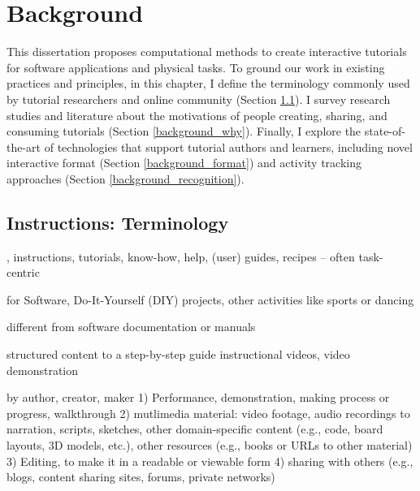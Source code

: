 
\chapter{Background}

This dissertation proposes computational methods to create interactive tutorials for software applications and physical tasks. To ground our work in existing practices and principles, in this chapter, I define the terminology commonly used by tutorial researchers and online community (Section \ref{background_terms}).
%
I survey research studies and literature about the motivations of people creating, sharing, and consuming tutorials (Section \ref{background_why}).
%
Finally, I explore the state-of-the-art of technologies that support tutorial authors and learners, including novel interactive format (Section \ref{background_format}) and activity tracking approaches (Section \ref{background_recognition}).


\section{Instructions: Terminology}
\label{background_terms}

, instructions, tutorials, know-how, help, (user) guides, recipes -- often task-centric

for Software, Do-It-Yourself (DIY) projects, other activities like sports or dancing

different from software documentation or manuals

structured content to a step-by-step guide
instructional videos, video demonstration

by author, creator, maker
1) Performance, demonstration, making process or progress, walkthrough
2) mutlimedia material: video footage, audio recordings to narration, scripts, sketches, other domain-specific content (e.g., code, board layouts, 3D models, etc.), other resources (e.g., books or URLs to other material)
3) Editing, to make it in a readable or viewable form
4) sharing with others (e.g., blogs, content sharing sites, forums, private networks)


